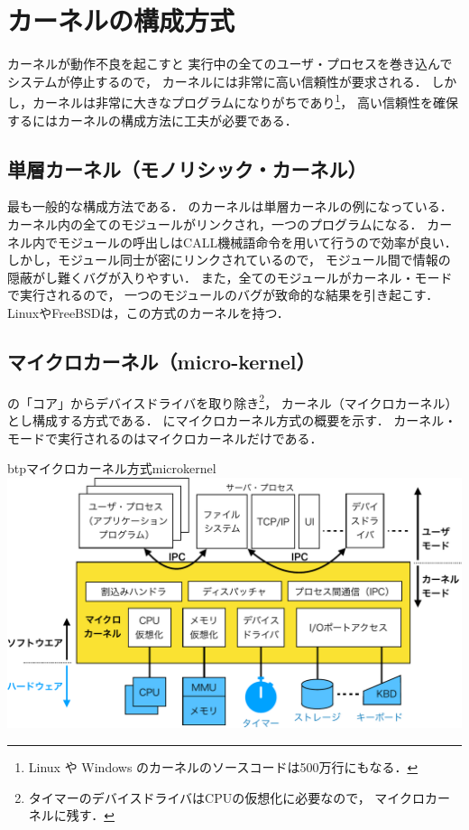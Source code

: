 \section{カーネルの構成方式}
カーネルが動作不良を起こすと
実行中の全てのユーザ・プロセスを巻き込んでシステムが停止するので，
カーネルには非常に高い信頼性が要求される．
しかし，カーネルは非常に大きなプログラムになりがちであり\footnote{
  Linux や Windows のカーネルのソースコードは500万行にもなる\cite{lines}．}，
高い信頼性を確保するにはカーネルの構成方法に工夫が必要である．

\subsection{単層カーネル（モノリシック・カーネル）}
最も一般的な構成方法である．
のカーネルは単層カーネルの例になっている．
カーネル内の全てのモジュールがリンクされ，一つのプログラムになる．
カーネル内でモジュールの呼出しはCALL機械語命令を用いて行うので効率が良い．
しかし，モジュール同士が密にリンクされているので，
モジュール間で情報の隠蔽がし難くバグが入りやすい．
また，全てのモジュールがカーネル・モードで実行されるので，
一つのモジュールのバグが致命的な結果を引き起こす．
LinuxやFreeBSDは，この方式のカーネルを持つ．

\subsection{マイクロカーネル（micro-kernel）}
の「コア」からデバイスドライバを取り除き\footnote{
  タイマーのデバイスドライバはCPUの仮想化に必要なので，
  マイクロカーネルに残す．}，
カーネル（マイクロカーネル）とし構成する方式である．
にマイクロカーネル方式の概要を示す．
カーネル・モードで実行されるのはマイクロカーネルだけである．

\begin{myfig}{btp}{マイクロカーネル方式}{microkernel}
  \includegraphics[scale=0.66]{Fig/microkernel-crop.pdf}
\end{myfig}

